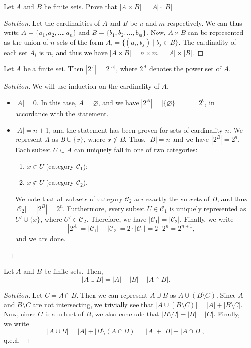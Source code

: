 \begin{problem}
    Let $A$ and $B$ be finite sets. Prove that $|A \times B| = |A| \cdot |B|$.
\end{problem}
\begin{proof}[Solution]
    Let the cardinalities of $A$ and $B$ be $n$ and $m$ respectively. We can thus write $A = \{a_1, a_2, ..., a_n\}$ and $B = \{b_1, b_2, ..., b_m\}$. Now, $A \times B$ can be represented as the union of $n$ sets of the form $A_i = \{ (a_i, b_j) \mid b_j \in B \}$. The cardinality of each set $A_i$ is $m$, and thus we have $|A \times B| = n \times m = |A| \times |B|$.
\end{proof}

\begin{problem}
    Let $A$ be a finite set. Then $|2^A| = 2^{|A|}$, where $2^A$ denotes the power set of $A$.
\end{problem}
\begin{proof}[Solution]
    We will use induction on the cardinality of $A$.
    \begin{itemize}
        \item
            $|A| = 0$. In this case, $A = \varnothing$, and we have $|2^A| = |\{\varnothing\}| = 1 = 2^0$, in accordance with the statement.
        \item
            $|A| = n+1$, and the statement has been proven for sets of cardinality $n$. We represent $A$ as $B \cup \{x\}$, where $x \nin B$. Thus, $|B| = n$ and we have $|2^B| = 2^{n}$. Each subset $U \subset A$ can uniquely fall in one of two categories:
            \begin{enumerate}
                \item $x \in U$ (category $\mathcal{C}_1$);
                \item $x \nin U$ (category $\mathcal{C}_2$).
            \end{enumerate}
            We note that all subsets of category $\mathcal{C}_2$ are exactly the subsets of $B$, and thus $|\mathcal{C}_2|$ = $|2^B| = 2^n$. Furthermore, every subset $U \in \mathcal{C}_1$ is uniquely represented as $U' \cup \{x\}$, where $U' \in \mathcal{C}_2$. Therefore, we have $|\mathcal{C}_1| = |\mathcal{C}_2|$. Finally, we write
            \[ |2^A| = |\mathcal{C}_1| + |\mathcal{C}_2| = 2 \cdot |\mathcal{C}_1| = 2 \cdot 2^n = 2^{n+1}, \]
            and we are done.
    \end{itemize}
\end{proof}

\begin{problem}
    Let $A$ and $B$ be finite sets. Then,
    \[ |A \cup B| = |A| + |B| - |A \cap B|. \] 
\end{problem}
\begin{proof}[Solution]
    Let $C = A \cap B$. Then we can represent $A \cup B$ as $A \cup (B \setminus C)$. Since $A$ and $B \setminus C$ are not intersecting, we trivially see that $|A \cup (B \setminus C)| = |A| + |B \setminus C|$. Now, since $C$ is a subset of $B$, we also conclude that $|B \setminus C| = |B| - |C|$. Finally, we write
    \[
        |A \cup B| = |A| + |B \setminus (A \cap B)| = |A| + |B| - |A \cap B|,
    \] q.e.d. 
\end{proof}

